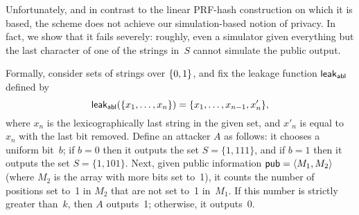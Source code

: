   Unfortunately, and in contrast to the linear
PRF-hash construction on which it is based, the scheme does not
achieve our simulation-based notion of privacy. In fact, we show
that it fails severely: roughly, even a simulator given everything
but the last character of one of the strings in~$S$ cannot simulate
the public output.


 

Formally, consider sets of strings over $\{0,1\}$, and fix the leakage
function ${\sf leak}_{\mathsf{abl}}$ defined by
\[{\sf leak}_{\mathsf{abl}}(\{x_1, \ldots, x_n\}) = \{x_1, \ldots, x_{n-1},
x'_n\},\] where $x_n$ is the lexicographically last string in the
given set, and $x'_n$ is equal to $x_n$ with the last bit removed.
Define an attacker $A$ as follows: it chooses a uniform bit~$b$; if
$b=0$ then it outputs the set $S=\{1,111\}$, and if $b=1$ then it
outputs the set $S=\{1, 101\}$. Next, given public information ${\sf pub}
= \langle M_1, M_2 \rangle$ (where $M_2$ is the array with more bits
set to~1), it counts the number of positions set to~1 in $M_2$ that
are not set to~1 in~$M_1$. If this number is strictly greater
than~$k$, then $A$ outputs~1; otherwise, it outputs~0.

